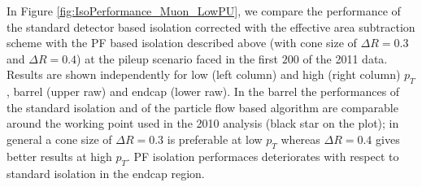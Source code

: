 In Figure \ref{fig:IsoPerformance_Muon_LowPU}, we compare the performance of the 
standard detector based isolation corrected with the effective area subtraction scheme with 
the PF based isolation described above (with cone size of $\Delta R=0.3$ and $\Delta R=0.4$) 
at the pileup scenario faced in the first $200$ \ipb of the 2011 data. Results are shown independently 
for low (left column) and high (right column) $p_T$, barrel (upper raw) and endcap (lower raw).
In the barrel the performances of the standard isolation and of the particle flow based algorithm
are comparable around the working point used in the 2010 analysis (black star on the plot);
in general a cone size of $\Delta R=0.3$ is preferable at low $p_T$ whereas $\Delta R=0.4$ gives better results
at high $p_T$. PF isolation performaces deteriorates with respect to standard isolation in the 
endcap region.


